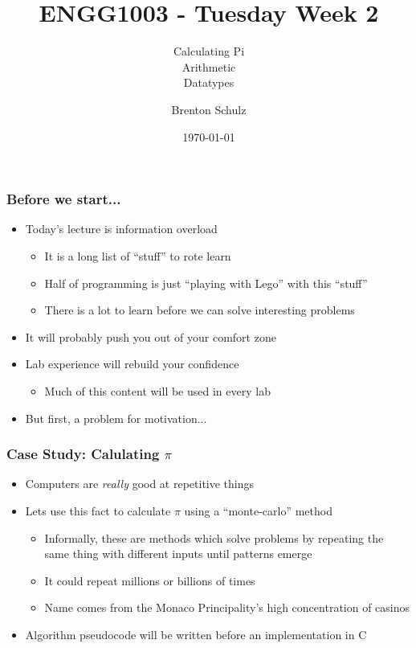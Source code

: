 \documentclass[14pt]{beamer}
\title{ENGG1003 - Tuesday Week 2}
\subtitle{Calculating Pi\\Arithmetic\\Datatypes}
\author{Brenton Schulz}
\institute{University of Newcastle}
\date{\today}
\begin{document}
\titlepage

\begin{frame}
\frametitle{Before we start...}
\begin{itemize}
\item Today's lecture is information overload
	\begin{itemize}
		\item It is a long list of ``stuff'' to rote learn
		\item Half of programming is just ``playing with Lego'' with this ``stuff''
		\item There is a lot to learn before we can solve interesting problems
	\end{itemize}
\item It will probably push you out of your comfort zone
\item Lab experience will rebuild your confidence
	\begin{itemize}
		\item Much of this content will be used in every lab
	\end{itemize}
\item But first, a problem for motivation...
\end{itemize}
\end{frame}

\begin{frame}
\frametitle{Case Study: Calulating $\pi$}
\begin{itemize}
\item Computers are \textit{really} good at repetitive things
\item Lets use this fact to calculate $\pi$ using a ``monte-carlo'' method
	\begin{itemize}
		\item Informally, these are methods which solve problems by repeating the same thing with different inputs until patterns emerge
		\item It could repeat millions or billions of times
		\item Name comes from the Monaco Principality's high concentration of casinos
	\end{itemize}
\item Algorithm pseudocode will be written before an implementation in C
\end{itemize}
\end{frame}
\end{document}
